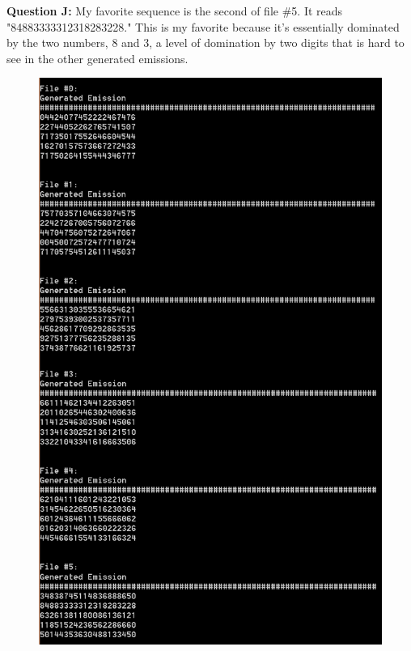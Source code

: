 \documentclass[12 pt]{article}
\begin{document}
	 \noindent\textbf{Question J:} My favorite sequence is the second of file $\#$5. It reads "84883333312318283228." This is my favorite because it's essentially dominated by the two numbers, 8 and 3, a level of domination by two digits that is hard to see in the other generated emissions.\\
	 \begin{figure}[H]
	 	\includegraphics[width=13cm]{2J}
	 \end{figure} 


	
\end{document}

